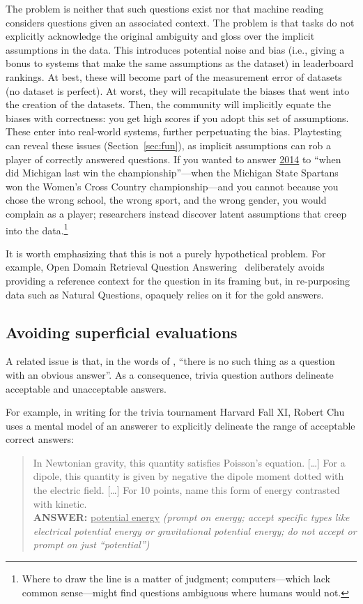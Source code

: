 The problem is neither that such questions exist nor that machine
reading  considers questions given an associated context.
The problem is that tasks do not explicitly acknowledge the original
ambiguity and gloss over the implicit assumptions in the data.
This introduces potential noise and bias (i.e., giving a bonus to systems that make
the same assumptions as the dataset) in leaderboard rankings.
At best, these will become part of
the measurement error of datasets (no dataset is perfect).
At worst, they will recapitulate the biases that went into the creation of the datasets.
Then, the community will implicitly equate the biases with correctness: you get high scores if you
adopt this set of assumptions.
These enter into real-world systems, further perpetuating the bias.
Playtesting can reveal these issues (Section~\ref{sec:fun}), as implicit assumptions
can rob a player of correctly answered questions.
If you wanted to answer \underline{2014} to ``when did Michigan last win the championship''---when the Michigan State Spartans won the Women's Cross Country championship---and you cannot because you chose the wrong school, the wrong sport, and the wrong gender,
you would complain as a player; researchers instead discover latent assumptions that creep into the data.\footnote{Where to draw the line is a matter of judgment; computers---which lack common sense---might find questions ambiguous where humans would not.}

It is worth emphasizing that this is not a purely hypothetical problem. For example, Open Domain Retrieval Question Answering~\cite{lee-19} deliberately avoids providing a reference context for the question in its framing but, in re-purposing data such as Natural Questions, opaquely relies on it for the gold answers.

\subsection{Avoiding superficial evaluations}

A related issue is that, in the words of \citet{voorhees-00}, ``there is no such
thing as a question with an obvious answer''.
As a consequence, trivia question authors
delineate acceptable and unacceptable answers.

For example, in writing for the trivia tournament Harvard Fall XI, Robert Chu uses a mental model of an answerer to explicitly delineate the range of acceptable correct answers:
\begin{quote}
     In Newtonian gravity, this quantity satisfies Poisson's equation. [\dots] For a dipole, this quantity is given by negative the dipole moment dotted with the electric field. [\dots] For 10 points, name this form of energy contrasted with kinetic.\\
    {\bf ANSWER:} \underline{potential energy} \textit{(prompt on energy; accept specific types like electrical potential energy or gravitational potential energy; do not accept or prompt on just ``potential'')}
\end{quote}

